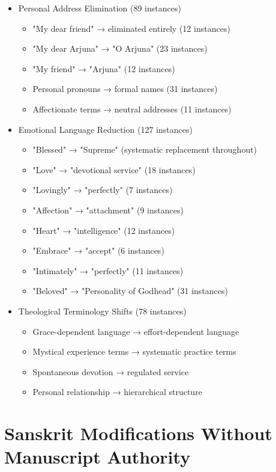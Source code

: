 \documentclass[11pt,twoside]{book}
\begin{document}
\begin{itemize}
\item Personal Address Elimination (89 instances)
\label{sec:org4ed89ce}
\begin{itemize}
\item "My dear friend" → eliminated entirely (12 instances)
\item "My dear Arjuna" → "O Arjuna" (23 instances)
\item "My friend" → "Arjuna" (12 instances)
\item Personal pronouns → formal names (31 instances)
\item Affectionate terms → neutral addresses (11 instances)
\end{itemize}
\item Emotional Language Reduction (127 instances)
\label{sec:org5f7db84}
\begin{itemize}
\item "Blessed" → "Supreme" (systematic replacement throughout)
\item "Love" → "devotional service" (18 instances)
\item "Lovingly" → "perfectly" (7 instances)
\item "Affection" → "attachment" (9 instances)
\item "Heart" → "intelligence" (12 instances)
\item "Embrace" → "accept" (6 instances)
\item "Intimately" → "perfectly" (11 instances)
\item "Beloved" → "Personality of Godhead" (31 instances)
\end{itemize}
\item Theological Terminology Shifts (78 instances)
\label{sec:orgcb20101}
\begin{itemize}
\item Grace-dependent language → effort-dependent language
\item Mystical experience terms → systematic practice terms
\item Spontaneous devotion → regulated service
\item Personal relationship → hierarchical structure
\end{itemize}
\end{itemize}
\section*{Sanskrit Modifications Without Manuscript Authority}
\label{sec:orga418e08}
\end{document}
